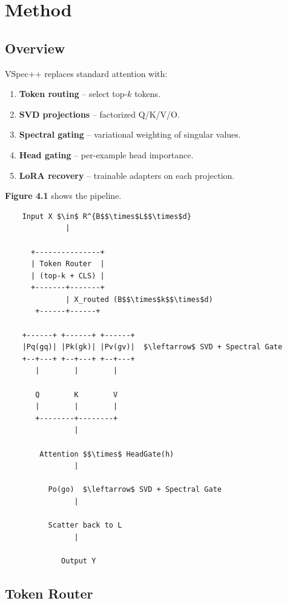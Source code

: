 \section{Method}

\subsection{Overview}

VSpec++ replaces standard attention with:

\begin{enumerate}
\item \textbf{Token routing} -- select top-$k$ tokens.
\item \textbf{SVD projections} -- factorized Q/K/V/O.
\item \textbf{Spectral gating} -- variational weighting of singular values.
\item \textbf{Head gating} -- per-example head importance.
\item \textbf{LoRA recovery} -- trainable adapters on each projection.

\end{enumerate}
\textbf{Figure 4.1} shows the pipeline.

\begin{lstlisting}
    Input X $\in$ R^{B$$\times$L$$\times$d}
              |
               
      +---------------+
      | Token Router  |
      | (top-k + CLS) |
      +-------+-------+
              | X_routed (B$$\times$k$$\times$d)
       +------+------+
                      
    +------+ +------+ +------+
    |Pq(gq)| |Pk(gk)| |Pv(gv)|  $\leftarrow$ SVD + Spectral Gate
    +--+---+ +--+---+ +--+---+
       |        |        |
                          
       Q        K        V
       |        |        |
       +--------+--------+
                |
                 
        Attention $$\times$ HeadGate(h)
                |
                 
          Po(go)  $\leftarrow$ SVD + Spectral Gate
                |
                 
          Scatter back to L
                |
                 
             Output Y
\end{lstlisting}

\subsection{Token Router}

